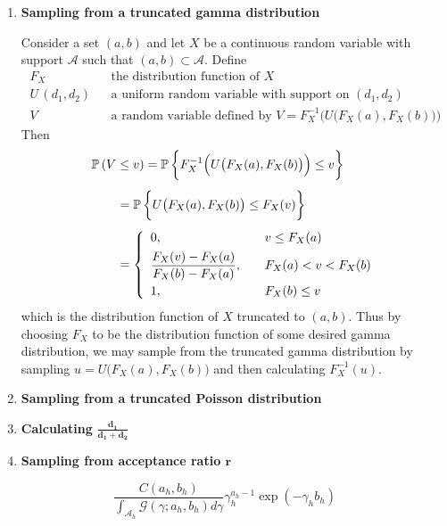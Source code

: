 \documentclass[11pt]{article}
\newcommand{\prob}{\mathbb{P}\,}
\begin{document}
\begin{enumerate}[label=(\roman*), itemsep=10mm]
\item \textbf{Sampling from a truncated gamma distribution}

Consider a set $(a,b)$ and let $X$ be a continuous random variable with support $\mathcal{A}$ such that $(a,b) \subset \mathcal{A}$.  Define
\[ \begin{array}{lll}
F_X & & \text{the distribution function of $X$} \\[1ex]
U\,(d_1,d_2) & & \text{a uniform random variable with support on $(d_1,d_2)$} \\[1ex]
V & & \text{a random variable defined by $V = F_X^{-1}\Big( U\big( F_X(a), F_X(b) \big) \Big)$}
\end{array} \]
Then
\begin{align*} \MoveEqLeft
\prob(V \leq v) = \prob \bigg\{ F_X^{-1}\Big( U\big( F_X(a), F_X(b) \big) \Big) \leq v \bigg\} \\[1ex]
&= \prob \bigg\{ U\big( F_X(a), F_X(b) \big) \leq F_X(v) \bigg\} \\[1ex]
&= \left\{ \begin{array}{lll}
0, & & v \leq F_X(a) \\[1ex]
\displaystyle \frac{ F_X(v) - F_X(a) }{ F_X(b) - F_X(a) }, & & F_X(a) < v < F_X(b) \\[2ex]
1, & & F_X(b) \leq v
\end{array} \right. \end{align*}
which is the distribution function of $X$ truncated to $(a,b)$.  Thus by choosing $F_X$ to be the distribution function of some desired gamma distribution, we may sample from the truncated gamma distribution by sampling $u = U\big( F_X(a), F_X(b) \big)$ and then calculating $F_X^{-1}(u)$. 


\item \textbf{Sampling from a truncated Poisson distribution}

\item \textbf{Calculating } $\displaystyle \boldsymbol{\frac{d_1}{d_1 + d_2}}$

\item \textbf{Sampling from acceptance ratio $\boldsymbol{r}$}

\end{enumerate}


\[ \frac{ C(a_h,b_h) }{ \int_{\mathcal{A}_h} \mathcal{G}(\gamma; a_h, b_h) d\gamma } \gamma_h^{a_h-1} \exp( -\gamma_h b_h ) \]
\end{document}
